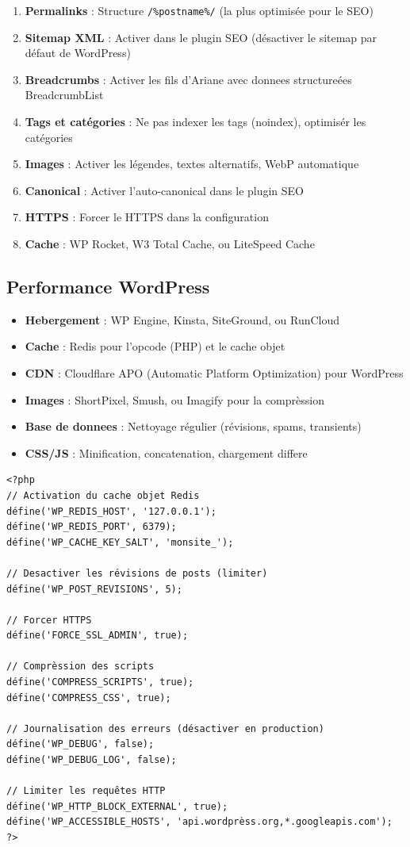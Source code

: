 \begin{enumerate}
    \item \textbf{Permalinks} : Structure \texttt{/\%postname\%/} (la plus optimisée pour le SEO)
    \item \textbf{Sitemap XML} : Activer dans le plugin SEO (désactiver le sitemap par défaut de WordPress)
    \item \textbf{Breadcrumbs} : Activer les fils d'Ariane avec donnees structureées BreadcrumbList
    \item \textbf{Tags et catégories} : Ne pas indexer les tags (noindex), optimisér les catégories
    \item \textbf{Images} : Activer les légendes, textes alternatifs, WebP automatique
    \item \textbf{Canonical} : Activer l'auto-canonical dans le plugin SEO
    \item \textbf{HTTPS} : Forcer le HTTPS dans la configuration
    \item \textbf{Cache} : WP Rocket, W3 Total Cache, ou LiteSpeed Cache
\end{enumerate}

\subsection{Performance WordPress}

\begin{itemize}
    \item \textbf{Hebergement} : WP Engine, Kinsta, SiteGround, ou RunCloud
    \item \textbf{Cache} : Redis pour l'opcode (PHP) et le cache objet
    \item \textbf{CDN} : Cloudflare APO (Automatic Platform Optimization) pour WordPress
    \item \textbf{Images} : ShortPixel, Smush, ou Imagify pour la comprèssion
    \item \textbf{Base de donnees} : Nettoyage régulier (révisions, spams, transients)
    \item \textbf{CSS/JS} : Minification, concatenation, chargement differe
\end{itemize}

\begin{lstlisting}[style=code,caption={Configuration wp-config.php pour les performances SEO}]
<?php
// Activation du cache objet Redis
défine('WP_REDIS_HOST', '127.0.0.1');
défine('WP_REDIS_PORT', 6379);
défine('WP_CACHE_KEY_SALT', 'monsite_');

// Desactiver les révisions de posts (limiter)
défine('WP_POST_REVISIONS', 5);

// Forcer HTTPS
défine('FORCE_SSL_ADMIN', true);

// Comprèssion des scripts
défine('COMPRESS_SCRIPTS', true);
défine('COMPRESS_CSS', true);

// Journalisation des erreurs (désactiver en production)
défine('WP_DEBUG', false);
défine('WP_DEBUG_LOG', false);

// Limiter les requêtes HTTP
défine('WP_HTTP_BLOCK_EXTERNAL', true);
défine('WP_ACCESSIBLE_HOSTS', 'api.wordprèss.org,*.googleapis.com');
?>
\end{lstlisting}

